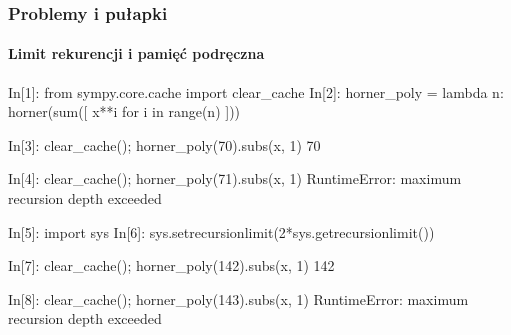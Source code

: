 \documentclass[10pt]{beamer}
\begin{document}
\begin{frame}[fragile]
  \frametitle{Problemy i pułapki}
  \framesubtitle{Limit rekurencji i pamięć podręczna}

  \begin{python}
    In[1]: from sympy.core.cache import clear_cache
    In[2]: horner_poly = lambda n: horner(sum([ x**i for i in range(n) ]))
  \end{python}

  \begin{python}
    In[3]: clear_cache(); horner_poly(70).subs(x, 1)
    70
  \end{python}

  \begin{python}
    In[4]: clear_cache(); horner_poly(71).subs(x, 1)
    RuntimeError: maximum recursion depth exceeded
  \end{python}

  \pause

  \begin{python}
    In[5]: import sys
    In[6]: sys.setrecursionlimit(2*sys.getrecursionlimit())
  \end{python}

  \begin{python}
    In[7]: clear_cache(); horner_poly(142).subs(x, 1)
    142
  \end{python}

  \begin{python}
    In[8]: clear_cache(); horner_poly(143).subs(x, 1)
    RuntimeError: maximum recursion depth exceeded
  \end{python}
\end{frame}
\end{document}
